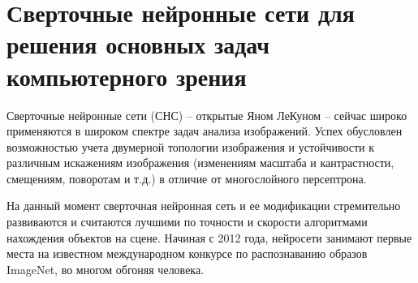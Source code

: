 \section{Сверточные нейронные сети для решения основных задач компьютерного зрения}

Сверточные нейронные сети (СНС) -- открытые Яном ЛеКуном -- сейчас широко применяются в широком спектре задач анализа изображений. Успех обусловлен возможностью учета двумерной топологии изображения и устойчивости к различным искажениям изображения (изменениям масштаба и кантрастности, смещениям, поворотам и т.д.) в отличие от многослойного персептрона.

На данный момент сверточная нейронная сеть и ее модификации стремительно развиваются и считаются лучшими по точности и скорости алгоритмами нахождения объектов на сцене. Начиная с 2012 года, нейросети занимают первые места на известном международном конкурсе по распознаванию образов ImageNet, во многом обгоняя человека.




\clearpage